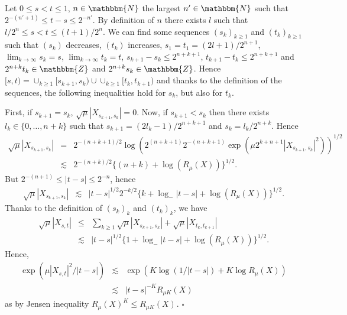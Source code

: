 \documentclass[a4paper,11pt]{article}
\newenvironment{proof}{{\sc Proof.}}{\hfill$\square$}
\begin{document}
\begin{proof}
  Let $0 \leqslant s<t \leqslant 1$, $n \in \mathbbm{N}$ the largest $n' \in
  \mathbbm{N}$ such that $2^{- (n' +1)} \leqslant t-s \leqslant 2^{-n'}$. By
  definition of $n$ there exists $l$ such that $l/2^{n} \leqslant s<t
  \leqslant (l+1) /2^{n}$. We can find some sequences $(s_{k} )_{k \ge 1}$ and
  $(t_{k} )_{k \ge 1}$ such that $(s_{k} )$ decreases, $(t_{k} )$ increases,
  $s_{1} =t_{1} = (2l+1) /2^{n+1}$, $\lim_{k \to \infty}  s_{k} =s$, $\lim_{k
  \to \infty}  t_{k} =t$, $s_{k+1} -s_{k} \leqslant 2^{n+k+1}$, $t_{k+1}
  -t_{k} \leqslant 2^{n+k+1}$ and $2^{n+k} t_{k} \in \mathbbm{Z}$ and $2^{n+k}
  s_{k} \in \mathbbm{Z}$. Hence $[s,t) = \cup_{k \ge 1} [s_{k+1} ,s_{k} ) \cup
  \cup_{k \ge 1} [t_{k} ,t_{k+1} )$ and thanks to the definition of the
  sequences, the following inequalities hold for $s_{k}$, but also for
  $t_{k}$.
  
  First, if $s_{k+1} =s_{k}$, $\sqrt{\mu} | X_{s_{k+1} ,s_{k}} | =0$. Now, if
  $s_{k+1} <s_{k}$ then there exists $l_{k} \in \{ 0, \ldots ,n+k \}$ such
  that $s_{k+1} = ( 2l_{k} -1 ) /2^{n+k+1}$ and $s_{k} =l_{k} /2^{n+k}$. Hence
  \begin{eqnarray*}
    \sqrt{\mu} | X_{s_{k+1} ,s_{k}} | & = & 2^{- ( n+k+1 ) /2} \log ( 2^{(
    n+k+1 )} 2^{- ( n+k+1 )} \exp ( \mu 2^{k+n+1} | X_{s_{k+1} ,s_{k}} |^{2} )
    )^{1/2}\\
    & \lesssim & 2^{- ( n+k ) /2} \{ ( n+k ) + \log ( R_{\mu} ( X ) )
    \}^{1/2} .
  \end{eqnarray*}
  But $2^{- ( n+1 )} \leqslant | t-s | \leqslant 2^{-n}$, hence
  \begin{eqnarray*}
    \sqrt{\mu} | X_{s_{k+1} ,s_{k}} | & \lesssim   & | t-s |^{1/2} 2^{-k/2} \{
    k+ \log_{-} | t-s | + \log ( R_{\mu} ( X ) ) \}^{1/2} .
  \end{eqnarray*}
  Thanks to the definition of $( s_{k} )_{k}$ and $( t_{k} )_{k}$, we have
  \begin{eqnarray*}
    \sqrt{\mu} | X_{s,t} | & \leqslant & \sum_{k \geqslant 1} \sqrt{\mu} |
    X_{s_{k+1} ,s_{k}} | + \sqrt{\mu} | X_{t_{k} ,t_{k+1}} |\\
    & \lesssim & | t-s |^{1/2} \{ 1+ \log_{-} | t-s | + \log ( R_{\mu} ( X )
    ) \}^{1/2} .
  \end{eqnarray*}
  Hence,
  \begin{eqnarray*}
    \exp ( \mu | X_{s,t} |^{2} / | t-s | ) & \lesssim & \exp ( K  \log ( 1/ |
    t-s | ) +K  \log  R_{\mu} ( X ) )\\
    & \lesssim & | t-s |^{-K} R_{\mu K} ( X )
  \end{eqnarray*}
  as by Jensen inequality $R_{\mu} ( X )^{K} \leqslant R_{\mu K} ( X )^{}$.
\end{proof}
\end{document}
